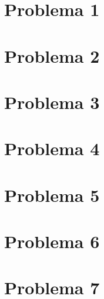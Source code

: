 \documentclass{homework}
\begin{document}
	\section{Problema 1}
\color{blue}

\color{black}
	



	\section{Problema 2}
\color{blue}

\color{black}
	



	\section{Problema 3}
\color{blue}

\color{black}
	



	\section{Problema 4}
\color{blue}

\color{black}
	



	\section{Problema 5}
\color{blue}

\color{black}
	



	\section{Problema 6}
\color{blue}

\color{black}
	



	\section{Problema 7}
\color{blue}
\end{document}
